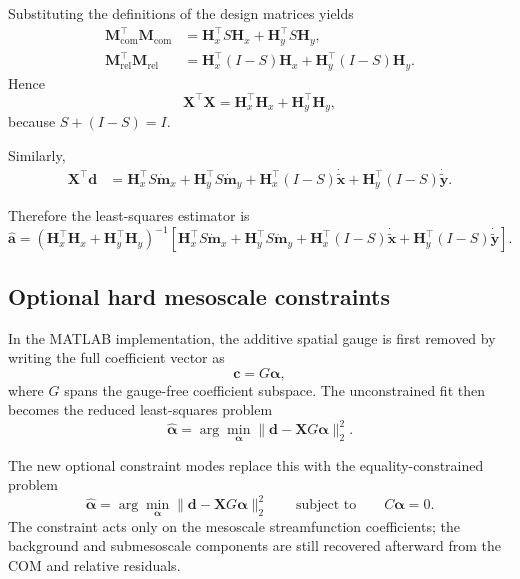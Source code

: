 \documentclass{article}
\begin{document}
Substituting the definitions of the design matrices yields
\begin{align}
\mathbf{M}_{\mathrm{com}}^\top \mathbf{M}_{\mathrm{com}}
&=
\mathbf{H}_x^\top S \mathbf{H}_x
+
\mathbf{H}_y^\top S \mathbf{H}_y,
\\
\mathbf{M}_{\mathrm{rel}}^\top \mathbf{M}_{\mathrm{rel}}
&=
\mathbf{H}_x^\top (I-S) \mathbf{H}_x
+
\mathbf{H}_y^\top (I-S) \mathbf{H}_y.
\end{align}
Hence
\begin{equation}
\mathbf{X}^\top \mathbf{X}
=
\mathbf{H}_x^\top \mathbf{H}_x
+
\mathbf{H}_y^\top \mathbf{H}_y,
\end{equation}
because
\(
S + (I-S) = I.
\)

Similarly,
\begin{align}
\mathbf{X}^\top \mathbf d
&=
\mathbf{H}_x^\top S \dot{\mathbf m}_x
+
\mathbf{H}_y^\top S \dot{\mathbf m}_y
+
\mathbf{H}_x^\top (I-S)\dot{\tilde{\mathbf x}}
+
\mathbf{H}_y^\top (I-S)\dot{\tilde{\mathbf y}}.
\end{align}

Therefore the least-squares estimator is
\begin{equation}
\hat{\mathbf a}
=
\left(
\mathbf{H}_x^\top \mathbf{H}_x
+
\mathbf{H}_y^\top \mathbf{H}_y
\right)^{-1}
\left[
\mathbf{H}_x^\top S \dot{\mathbf m}_x
+
\mathbf{H}_y^\top S \dot{\mathbf m}_y
+
\mathbf{H}_x^\top (I-S)\dot{\tilde{\mathbf x}}
+
\mathbf{H}_y^\top (I-S)\dot{\tilde{\mathbf y}}
\right].
\label{eq:final_estimator}
\end{equation}

\subsection{Optional hard mesoscale constraints}

In the MATLAB implementation, the additive spatial gauge is first removed by
writing the full coefficient vector as
\begin{equation}
\mathbf c = G \boldsymbol{\alpha},
\end{equation}
where $G$ spans the gauge-free coefficient subspace. The unconstrained fit then
becomes the reduced least-squares problem
\begin{equation}
\hat{\boldsymbol{\alpha}}
=
\arg\min_{\boldsymbol{\alpha}}
\|
\mathbf d - \mathbf X G \boldsymbol{\alpha}
\|_2^2.
\end{equation}

The new optional constraint modes replace this with the equality-constrained
problem
\begin{equation}
\hat{\boldsymbol{\alpha}}
=
\arg\min_{\boldsymbol{\alpha}}
\|
\mathbf d - \mathbf X G \boldsymbol{\alpha}
\|_2^2
\qquad
\text{subject to}
\qquad
C\boldsymbol{\alpha}=0.
\label{eq:constrained_estimator}
\end{equation}
The constraint acts only on the mesoscale streamfunction coefficients; the
background and submesoscale components are still recovered afterward from the
COM and relative residuals.
\end{document}
